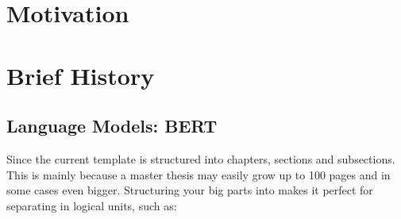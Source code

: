\section{Motivation}






\section{Brief History}

\subsection{Language Models: BERT}
Since the current template is structured into chapters, sections and subsections. This is mainly because a master thesis may easily grow up to 100 pages and in some cases even bigger. Structuring your big parts into  makes it perfect for separating in logical units, such as:

